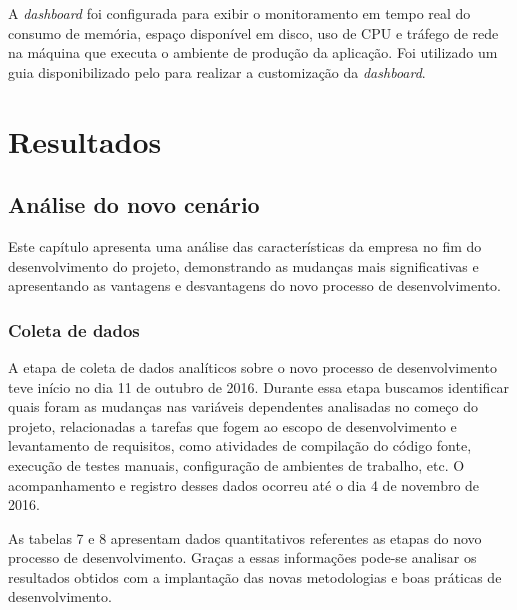 \documentclass[
12pt,				%
openright,			%
oneside,			%
a4paper,			%
english,			%
french,				%
spanish,			%
brazil,				%
]{abntex2}
\begin{document}
A \textit{dashboard} foi configurada para exibir o monitoramento em tempo real do consumo de memória, espaço disponível em disco, uso de CPU e tráfego de rede na máquina que executa o ambiente de produção da aplicação. Foi utilizado um guia disponibilizado pelo  para realizar a customização da \textit{dashboard}.





\part{Resultados}

\chapter{Análise do novo cenário}

Este capítulo apresenta uma análise das características da empresa no fim do desenvolvimento do projeto, demonstrando as mudanças mais significativas e apresentando as vantagens e desvantagens do novo processo de desenvolvimento.

\section{Coleta de dados}

A etapa de coleta de dados analíticos sobre o novo processo de desenvolvimento teve início no dia 11 de outubro de 2016. Durante essa etapa buscamos identificar quais foram as mudanças nas variáveis dependentes analisadas no começo do projeto, relacionadas a tarefas que fogem ao escopo de desenvolvimento e levantamento de requisitos, como atividades de compilação do código fonte, execução de testes manuais, configuração de ambientes de trabalho, etc. O acompanhamento e registro desses dados ocorreu até o dia 4 de novembro de 2016.

As tabelas 7 e 8 apresentam dados quantitativos referentes as etapas do novo processo de desenvolvimento. Graças a essas informações pode-se analisar os resultados obtidos com a implantação das novas metodologias e boas práticas de desenvolvimento.
\end{document}
